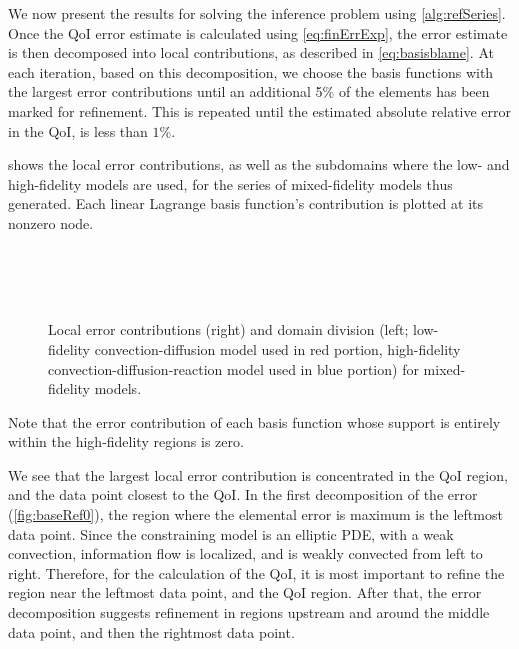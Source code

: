 We now present the results for solving the inference problem using \cref{alg:refSeries}. Once the QoI error estimate is calculated using \ref{eq:finErrExp}, the error estimate is then decomposed into local contributions, as described in \cref{eq:basisblame}. At each iteration, based on this decomposition, we choose the basis functions with the largest error contributions until an additional 5\% of the elements has been marked for refinement. This is repeated until the estimated absolute relative error in the QoI, is less than $1\%$.

 shows the local error contributions, as well as the subdomains where the low- and high-fidelity models are used, for the series of mixed-fidelity models thus generated. Each linear Lagrange basis function's contribution is plotted at its nonzero node.
%
\begin{figure}[htbp]
\centering
{} \\
 \\
 \\
\caption{Local error contributions (right) and domain division (left; low-fidelity convection-diffusion model used in red portion, high-fidelity convection-diffusion-reaction model used in blue portion) for mixed-fidelity models.}
\label{fig:baseRef}
\end{figure}
%
Note that the error contribution of each basis function whose support is entirely within the high-fidelity regions is zero.

We see that the largest local error contribution is concentrated in the QoI region, and the data point closest to the QoI. In the first decomposition of the error (\cref{fig:baseRef0}), the region where the elemental error is maximum is the leftmost data point. Since the constraining model is an elliptic PDE, with a weak convection, information flow is localized, and is weakly convected from left to right. Therefore, for the calculation of the QoI, it is most important to refine the region near the leftmost data point, and the QoI region. After that, the error decomposition suggests refinement in regions upstream and around the middle data point, and then the rightmost data point.

